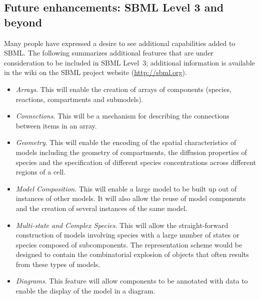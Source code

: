 \subsection{Future enhancements: SBML Level 3 and beyond}
\label{sec:level-3}

Many people have expressed a desire to see additional capabilities
added to SBML.  The following summarizes additional features that
are under consideration to be included in SBML Level~3; additional
information is available in the wiki on the SBML project website
(\url{http://sbml.org}).
\begin{itemize}
  
\item \emph{Arrays}.  This will enable the creation of arrays of
  components (species, reactions, compartments and submodels).
  
\item \emph{Connections}.  This will be a mechanism for describing
  the connections between items in an array.
  
\item \emph{Geometry}.  This will enable the encoding of the
  spatial characteristics of models including the geometry of
  compartments, the diffusion properties of species and the
  specification of different species concentrations across
  different regions of a cell.
  
\item \emph{Model Composition}.  This will enable a large model to
  be built up out of instances of other models.  It will also
  allow the reuse of model components and the creation of several
  instances of the same model.
  
\item \emph{Multi-state and Complex Species}.  This will allow the
  straight-forward construction of models involving species with a
  large number of states or species composed of subcomponents.
  The representation scheme would be designed to contain the
  combinatorial explosion of objects that often results from these
  types of models.
  
\item \emph{Diagrams}.  This feature will allow components to be
  annotated with data to enable the display of the model in a
  diagram.
  

\end{itemize}
